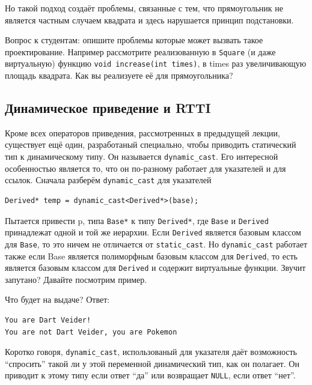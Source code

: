 \documentclass[a4paper,12pt,oneside]{article}
\begin{document}


Но такой подход создаёт проблемы, связанные с тем, что прямоугольник не является частным случаем квадрата и здесь нарушается принцип подстановки. 

Вопрос к студентам: опишите проблемы которые может вызвать такое проектирование. Например рассмотрите реализованную в \lstinline!Square! (и даже виртуальную) функцию \lstinline!void increase(int times)!, в times раз увеличивающую площадь квадрата. Как вы реализуете её для прямоугольника?

\subsection{Динамическое приведение и RTTI}

Кроме всех операторов приведения, рассмотренных в предыдущей лекции, существует ещё один, разработаный специально, чтобы приводить статический тип к динамическому типу. Он называется \lstinline!dynamic_cast!. Его интересной особенностью является то, что он по-разному работает для указателей и для ссылок. Сначала разберём \lstinline!dynamic_cast! для указателей

\begin{lstlisting}
Derived* temp = dynamic_cast<Derived*>(base);
\end{lstlisting}

Пытается привести p, типа \lstinline!Base*! к типу \lstinline!Derived*!, где \lstinline!Base! и \lstinline!Derived! принадлежат одной и той же иерархии. Если \lstinline!Derived! является базовым классом для \lstinline!Base!, то это ничем не отличается от \lstinline!static_cast!. Но \lstinline!dynamic_cast! работает также если Base является полиморфным базовым классом для \lstinline!Derived!, то есть является базовым классом для \lstinline!Derived! и содержит виртуальные функции. Звучит запутано? Давайте посмотрим пример.



Что будет на выдаче? Ответ:

\begin{lstlisting}[language=make]
You are Dart Veider!
You are not Dart Veider, you are Pokemon
\end{lstlisting}

Коротко говоря, \lstinline!dynamic_cast!, использованый для указателя даёт возможность ``спросить'' такой ли у этой переменной динамический тип, как он полагает. Он приводит к этому типу если ответ ``да'' или возвращает \lstinline!NULL!, если ответ ``нет''.
\end{document}
